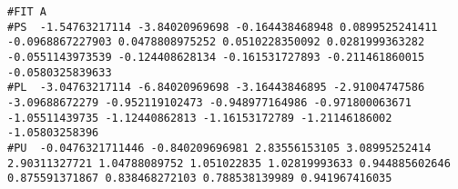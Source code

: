 \begin{lstlisting}[style=sFortran,caption={Potential}]
#FIT A
#PS  -1.54763217114 -3.84020969698 -0.164438468948 0.0899525241411 -0.0968867227903 0.0478808975252 0.0510228350092 0.0281999363282 -0.0551143973539 -0.124408628134 -0.161531727893 -0.211461860015 -0.0580325839633
#PL  -3.04763217114 -6.84020969698 -3.16443846895 -2.91004747586 -3.09688672279 -0.952119102473 -0.948977164986 -0.971800063671 -1.05511439735 -1.12440862813 -1.16153172789 -1.21146186002 -1.05803258396
#PU  -0.0476321711446 -0.840209696981 2.83556153105 3.08995252414 2.90311327721 1.04788089752 1.051022835 1.02819993633 0.944885602646 0.875591371867 0.838468272103 0.788538139989 0.941967416035
\end{lstlisting}























